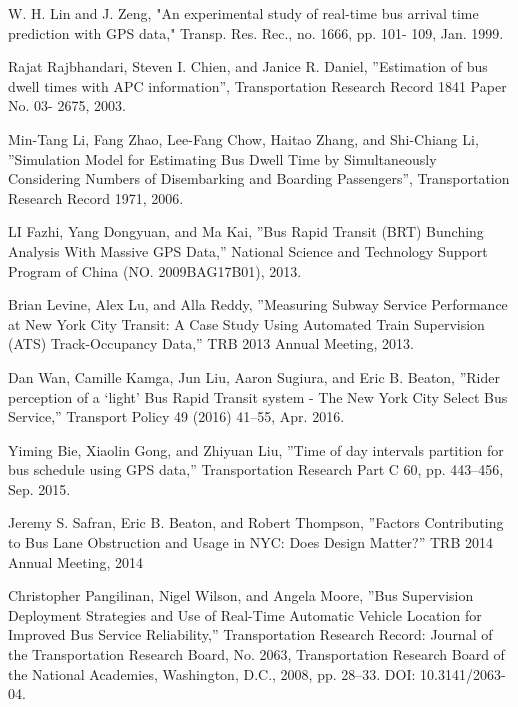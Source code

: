 \documentclass[12pt]{report}
\begin{document}
\vspace{1cm}



\begin{thebibliography}{14}

W. H. Lin and J. Zeng, "An experimental study of real-time bus arrival time prediction with GPS data," Transp. Res. Rec., no. 1666, pp. 101- 109, Jan. 1999.

Rajat Rajbhandari, Steven I. Chien, and Janice R. Daniel, ''Estimation of bus dwell times with APC information'', Transportation Research Record 1841 Paper No. 03- 2675, 2003.

Min-Tang Li, Fang Zhao, Lee-Fang Chow, Haitao Zhang, and Shi-Chiang Li, ''Simulation Model for Estimating Bus Dwell Time by Simultaneously Considering Numbers of Disembarking and Boarding Passengers'', Transportation Research Record 1971, 2006.

LI Fazhi, Yang Dongyuan, and Ma Kai, ''Bus Rapid Transit (BRT) Bunching Analysis With Massive GPS Data,'' National Science and Technology Support Program of China (NO. 2009BAG17B01), 2013.

Brian Levine, Alex Lu, and Alla Reddy, ''Measuring Subway Service Performance at New York City Transit: A Case Study Using Automated Train Supervision (ATS) Track-Occupancy Data,'' TRB 2013 Annual Meeting, 2013.

Dan Wan, Camille Kamga, Jun Liu, Aaron Sugiura, and Eric B. Beaton, ''Rider perception of a ‘light’ Bus Rapid Transit system - The New York City Select Bus Service,'' Transport Policy 49 (2016) 41–55, Apr. 2016.


Yiming Bie, Xiaolin Gong, and Zhiyuan Liu, ''Time of day intervals partition for bus schedule using GPS data,'' Transportation Research Part C 60, pp. 443–456, Sep. 2015.

Jeremy S. Safran, Eric B. Beaton, and Robert Thompson, ''Factors Contributing to Bus Lane Obstruction and Usage in NYC: Does Design Matter?'' TRB 2014 Annual Meeting, 2014

Christopher Pangilinan, Nigel Wilson, and Angela Moore, ''Bus Supervision Deployment Strategies and Use of Real-Time Automatic
Vehicle Location for Improved Bus Service Reliability,'' Transportation Research Record: Journal of the Transportation Research Board, No. 2063, Transportation Research Board of the National Academies, Washington, D.C., 2008, pp. 28–33. DOI: 10.3141/2063-04.


\end{thebibliography}
\end{document}
